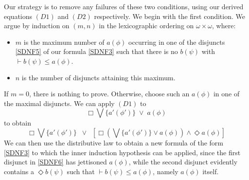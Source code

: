 Our strategy is to remove any failures of these two conditions, using our derived equations $(D1)$ and $(D2)$ respectively. We begin with the first condition.
We argue by induction on $(m, n)$ in the lexicographic ordering on $\omega \times \omega$, where:
\begin{itemize}
\item $m$ is the maximum number of $a(\phi )$ occurring in one of the disjuncts \ref{SDNF5} of our formula \ref{SDNF3} such that there is no $b(\psi )$ with $\vdash  b(\psi ) \leq a(\phi )$.
\item $n$ is the number of disjuncts attaining this maximum.
\end{itemize}
If $m = 0$, there is nothing to prove.
Otherwise, choose such an $a(\phi )$ in one of the maximal disjuncts.
We can apply $(D1)$ to 
\[ \Box \bigvee \{ a' (\phi' ) \} \; \vee \; a(\phi ) \]
to obtain
\begin{equation} 
\label{SDNF6}
\Box \bigvee \{ a' ( \phi' ) \} \;\; \vee \;\; [ \Box ( \bigvee \{ a' ( \phi' ) \} \vee a(\phi )) \wedge \Diamond a(\phi ) ]
\end{equation}
We can then use the distributive law to obtain a new formula of the form \ref{SDNF3} to which the inner induction hypothesis can be applied, since the first disjunct in \ref{SDNF6} has jettisoned $a(\phi )$, while the second disjunct evidently contains a $\Diamond b(\psi )$ such that $\vdash  b(\psi ) \leq a(\phi )$, namely $a(\phi )$ itself.

